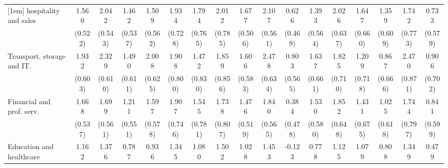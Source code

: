 {\begin{tabular}{l*{16}{c}}
[1em]
hospitality and sales&       1.560\sym{**} &       2.042\sym{***}&       1.462\sym{**} &       1.509\sym{**} &       1.934\sym{**} &       1.794\sym{*}  &       2.012\sym{*}  &       1.677\sym{***}&       2.107\sym{***}&       0.626         &       1.393\sym{*}  &       2.026\sym{**} &       1.647\sym{*}  &       1.359\sym{*}  &       1.742\sym{*}  &       0.733         \\
                    &     (0.522)         &     (0.543)         &     (0.537)         &     (0.562)         &     (0.728)         &     (0.765)         &     (0.785)         &     (0.506)         &     (0.561)         &     (0.469)         &     (0.564)         &     (0.637)         &     (0.660)         &     (0.609)         &     (0.773)         &     (0.579)         \\
[1em]
Transport, storage and IT.&       1.932\sym{**} &       2.329\sym{***}&       1.490\sym{*}  &       2.008\sym{**} &       1.908\sym{*}  &       1.472         &       1.859\sym{*}  &       1.606\sym{**} &       2.478\sym{***}&       0.803         &       1.637\sym{*}  &       1.825\sym{*}  &       1.209         &       0.867         &       2.470\sym{**} &       0.906         \\
                    &     (0.603)         &     (0.610)         &     (0.611)         &     (0.625)         &     (0.800)         &     (0.830)         &     (0.856)         &     (0.583)         &     (0.634)         &     (0.565)         &     (0.661)         &     (0.710)         &     (0.718)         &     (0.666)         &     (0.871)         &     (0.702)         \\
[1em]
Financial and prof. serv.&       1.668\sym{**} &       1.699\sym{**} &       1.211\sym{*}  &       1.597\sym{**} &       1.907\sym{*}  &       1.545\sym{*}  &       1.738\sym{*}  &       1.476\sym{**} &       1.840\sym{**} &       0.384         &       1.530\sym{**} &       1.852\sym{**} &       1.431\sym{*}  &       1.025         &       1.744\sym{*}  &       0.841         \\
                    &     (0.537)         &     (0.561)         &     (0.551)         &     (0.578)         &     (0.746)         &     (0.781)         &     (0.807)         &     (0.519)         &     (0.565)         &     (0.478)         &     (0.580)         &     (0.648)         &     (0.675)         &     (0.618)         &     (0.797)         &     (0.599)         \\
[1em]
Education and healthcare&       1.162\sym{*}  &       1.376\sym{*}  &       0.787         &       0.936         &       1.345         &       1.080         &       1.502         &       1.028         &       1.453\sym{*}  &      -0.123         &       0.778         &       1.125         &       1.079         &       0.808         &       1.349         &       0.479         \\

\end{tabular}}
